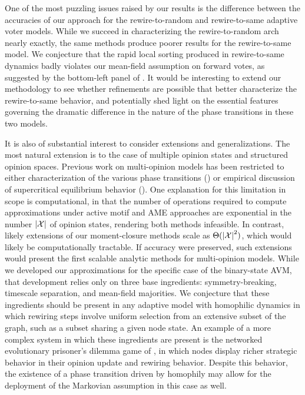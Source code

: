 \documentclass[review, onefignum, onetabnum]{siamart171218}
\begin{document}
	One of the most puzzling issues raised by our results is the difference between the accuracies of our approach for the rewire-to-random and rewire-to-same adaptive voter models. 
	While we succeed in characterizing the rewire-to-random arch nearly exactly, the same methods produce poorer results for the rewire-to-same model. 
	We conjecture that the rapid local sorting produced in rewire-to-same dynamics badly violates our mean-field assumption on forward votes, as suggested by the bottom-left panel of . 
	It would be interesting to extend our methodology to see whether refinements are possible that better characterize the rewire-to-same behavior, and potentially shed light on the essential features governing the dramatic difference in the nature of the phase transitions in these two models. 
		
	It is also of substantial interest to consider extensions and generalizations. 
	The most natural extension is to the case of multiple opinion states and structured opinion spaces. 
	Previous work on multi-opinion models has been restricted to either characterization of the various phase transitions (\cite{Bohme2012}) or empirical discussion of supercritical equilibrium behavior (\cite{Shi2013}). 
	One explanation for this limitation in scope is computational, in that the number of operations required to compute approximations under active motif and AME approaches are exponential in the number $\left|\mathcal{X}\right|$ of opinion states, rendering both methods infeasible. 
	In contrast, likely extensions of our moment-closure methods scale as $\Theta(\left|\mathcal{X}\right|^2)$, which would likely be computationally tractable. 
	If accuracy were preserved, such extensions would present the first scalable analytic methods for multi-opinion models. 
	While we developed our approximations for the specific case of the binary-state AVM, that development relies only on three base ingredients: symmetry-breaking, timescale separation, and mean-field majorities. 
	We conjecture that these ingredients should be present in any adaptive model with homophilic dynamics in which rewiring steps involve uniform selection from an extensive subset of the graph, such as a subset sharing a given node state. 
	An example of a more complex system in which these ingredients are present is the networked evolutionary prisoner's dilemma game of \cite{Lee2017a}, in which nodes display richer strategic behavior in their opinion update and rewiring behavior. 
	Despite this behavior, the existence of a phase transition driven by homophily may allow for the deployment of the Markovian assumption in this case as well. 
\end{document}
